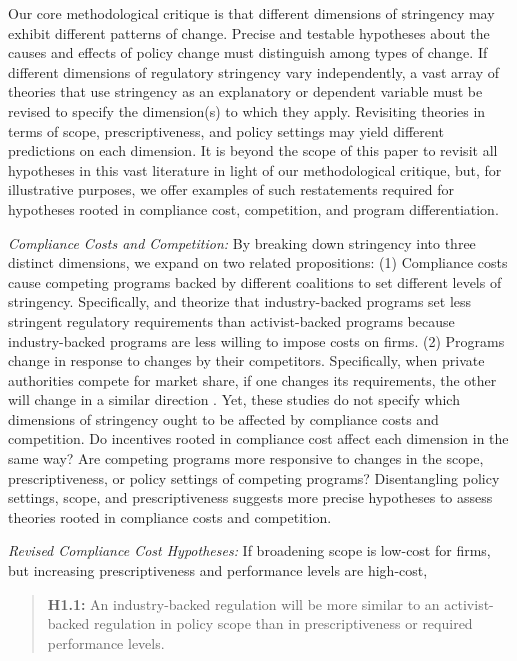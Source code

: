 \documentclass[
      12pt,
            Review ]{article}
\begin{document}
Our core methodological critique is that different dimensions of stringency may exhibit different patterns of change. Precise and testable hypotheses about the causes and effects of policy change must distinguish among types of change. If different dimensions of regulatory stringency vary independently, a vast array of theories that use stringency as an explanatory or dependent variable must be revised to specify the dimension(s) to which they apply. Revisiting theories in terms of scope, prescriptiveness, and policy settings may yield different predictions on each dimension. It is beyond the scope of this paper to revisit all hypotheses in this vast literature in light of our methodological critique, but, for illustrative purposes, we offer examples of such restatements required for hypotheses rooted in compliance cost, competition, and program differentiation.

\emph{Compliance Costs and Competition:} By breaking down stringency into three distinct dimensions, we expand on two related propositions: (1) Compliance costs cause competing programs backed by different coalitions to set different levels of stringency. Specifically, \citet{Cashore2004} and \citet{Fischer2014} theorize that industry-backed programs set less stringent regulatory requirements than activist-backed programs because industry-backed programs are less willing to impose costs on firms. (2) Programs change in response to changes by their competitors. Specifically, when private authorities compete for market share, if one changes its requirements, the other will change in a similar direction \citep{Fischer2014, Smith2010}. Yet, these studies do not specify which dimensions of stringency ought to be affected by compliance costs and competition. Do incentives rooted in compliance cost affect each dimension in the same way? Are competing programs more responsive to changes in the scope, prescriptiveness, or policy settings of competing programs? Disentangling policy settings, scope, and prescriptiveness suggests more precise hypotheses to assess theories rooted in compliance costs and competition.

\emph{Revised Compliance Cost Hypotheses:} If broadening scope is low-cost for firms, but increasing prescriptiveness and performance levels are high-cost,

\begin{quote}
\textbf{H1.1:} An industry-backed regulation will be more similar to an activist-backed regulation in policy scope than in prescriptiveness or required performance levels.
\end{quote}
\end{document}
